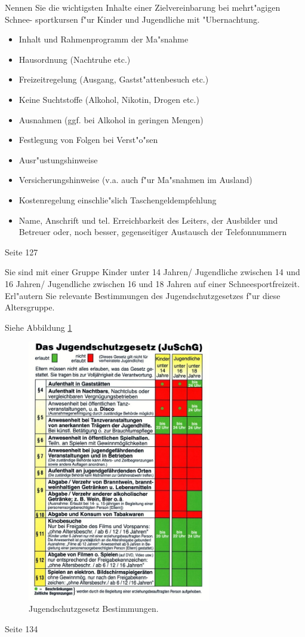 \begin{question}{4}
Nennen Sie die wichtigsten Inhalte einer Zielvereinbarung bei mehrt"agigen Schnee- sportkursen f"ur Kinder und Jugendliche mit "Ubernachtung.
\end{question}
\begin{solution}
\begin{itemize}
\item Inhalt und Rahmenprogramm der Ma"snahme
\item Hausordnung (Nachtruhe etc.)
\item Freizeitregelung (Ausgang, Gastst"attenbesuch etc.)
\item Keine Suchtstoffe (Alkohol, Nikotin, Drogen etc.)
\item Ausnahmen (ggf. bei Alkohol in geringen Mengen)
\item Festlegung von Folgen bei Verst"o"sen
\item Ausr"ustungshinweise
\item Versicherungshinweise (v.a. auch f"ur Ma"snahmen im Ausland)
\item Kostenregelung einschlie"slich Taschengeldempfehlung
\item Name, Anschrift und tel. Erreichbarkeit des Leiters, der Ausbilder und Betreuer oder, noch besser, gegenseitiger Austausch der Telefonnummern
\end{itemize}
 Seite 127
\end{solution}

\begin{question}{4}
Sie sind mit einer Gruppe Kinder unter 14 Jahren/ Jugendliche zwischen 14 und 16 Jahren/ Jugendliche zwischen 16 und 18 Jahren auf einer Schneesportfreizeit. Erl"autern Sie relevante Bestimmungen des Jugendschutzgesetzes f"ur diese Altersgruppe.
\end{question}
\begin{solution}
Siehe Abbildung \ref{fig:js}
\begin{figure}[H]
  \centering
  \includegraphics[width=8cm]{pic/js.jpg}
  \caption{Jugendschutzgesetz Bestimmungen.}
  \label{fig:js}
\end{figure}
 Seite 134
\end{solution}